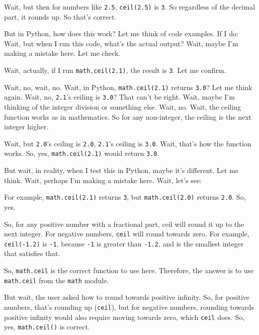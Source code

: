 Wait, but then for numbers like \texttt{2.5}, \texttt{ceil(2.5)} is \texttt{3}.
So regardless of the decimal part, it rounds up.
So that's correct.\smallskip

But in Python, how does this work?
Let me think of code examples.
If I do:%
%
{}%
%
Wait, but when I run this code, what's the actual output?
Wait, maybe I'm making a mistake here.
Let me check.\smallskip

Wait, actually, if I run \texttt{math.ceil(2.1)}, the result is \texttt{3}.
Let me confirm.\smallskip

Wait, no, wait, no.
Wait, in Python, \texttt{math.ceil(2.1)} returns \texttt{3.0}?
Let me think again.
Wait, no, \texttt{2.1}'s ceiling is \texttt{3.0}?
That can't be right.
Wait, maybe I'm thinking of the integer division or something else.
Wait, no. Wait, the ceiling function works as in mathematics.
So for any non-integer, the ceiling is the next integer higher.\smallskip

Wait, but \texttt{2.0}'s ceiling is \texttt{2.0}, \texttt{2.1}'s ceiling is \texttt{3.0}.
Wait, that's how the function works.
So, yes, \texttt{math.ceil(2.1)} would return \texttt{3.0}.\smallskip

But wait, in reality, when I test this in Python, maybe it's different.
Let me think.
Wait, perhaps I'm making a mistake here.
Wait, let's see:\smallskip

For example, \texttt{math.ceil(2.1)} returns \texttt{3}, but \texttt{math.ceil(2.0)} returns \texttt{2.0}.
So, yes.\smallskip

So, for any positive number with a fractional part, ceil will round it up to the next integer.
For negative numbers, \texttt{ceil} will round towards zero.
For example, \texttt{ceil(-1.2)} is \texttt{-1}, because \texttt{-1} is greater than \texttt{-1.2}, and is the smallest integer that satisfies that.\smallskip

So, \texttt{math.ceil} is the correct function to use here.
Therefore, the answer is to use \texttt{math.ceil} from the \texttt{math} module.\smallskip

But wait, the user asked how to round towards positive infinity.
So, for positive numbers, that's rounding up (\texttt{ceil}), but for negative numbers, rounding towards positive infinity would also require moving towards zero, which \texttt{ceil} does.
So, yes, \texttt{math.ceil()} is correct.\smallskip

